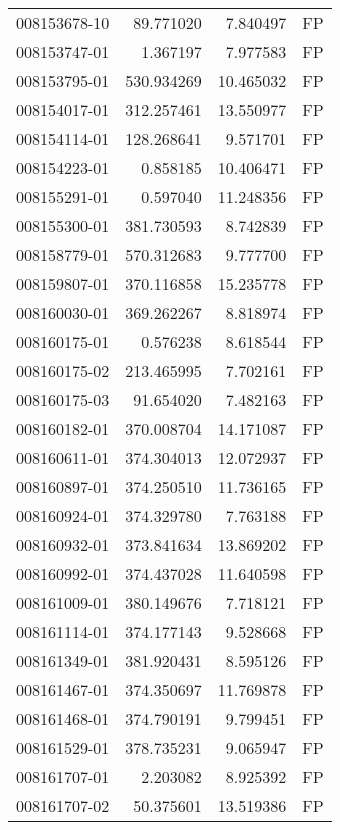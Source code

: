 \begin{tabular}{lrrl}
008153678-10 &   89.771020 &       7.840497 &   FP \\
008153747-01 &    1.367197 &       7.977583 &   FP \\
008153795-01 &  530.934269 &      10.465032 &   FP \\
008154017-01 &  312.257461 &      13.550977 &   FP \\
008154114-01 &  128.268641 &       9.571701 &   FP \\
008154223-01 &    0.858185 &      10.406471 &   FP \\
008155291-01 &    0.597040 &      11.248356 &   FP \\
008155300-01 &  381.730593 &       8.742839 &   FP \\
008158779-01 &  570.312683 &       9.777700 &   FP \\
008159807-01 &  370.116858 &      15.235778 &   FP \\
008160030-01 &  369.262267 &       8.818974 &   FP \\
008160175-01 &    0.576238 &       8.618544 &   FP \\
008160175-02 &  213.465995 &       7.702161 &   FP \\
008160175-03 &   91.654020 &       7.482163 &   FP \\
008160182-01 &  370.008704 &      14.171087 &   FP \\
008160611-01 &  374.304013 &      12.072937 &   FP \\
008160897-01 &  374.250510 &      11.736165 &   FP \\
008160924-01 &  374.329780 &       7.763188 &   FP \\
008160932-01 &  373.841634 &      13.869202 &   FP \\
008160992-01 &  374.437028 &      11.640598 &   FP \\
008161009-01 &  380.149676 &       7.718121 &   FP \\
008161114-01 &  374.177143 &       9.528668 &   FP \\
008161349-01 &  381.920431 &       8.595126 &   FP \\
008161467-01 &  374.350697 &      11.769878 &   FP \\
008161468-01 &  374.790191 &       9.799451 &   FP \\
008161529-01 &  378.735231 &       9.065947 &   FP \\
008161707-01 &    2.203082 &       8.925392 &   FP \\
008161707-02 &   50.375601 &      13.519386 &   FP \\

\end{tabular}
